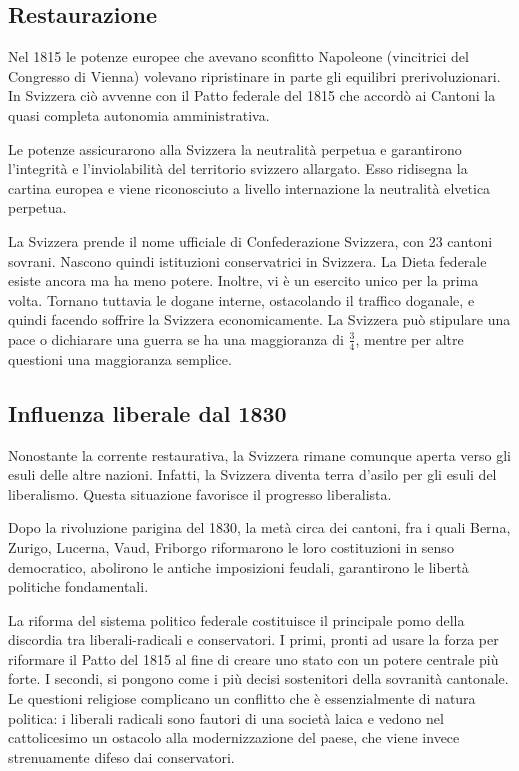 \documentclass[a4paper]{article}
\begin{document}
\subsection{Restaurazione}

Nel 1815 le potenze europee che avevano sconfitto Napoleone (vincitrici del Congresso di Vienna)
volevano ripristinare in parte gli equilibri prerivoluzionari.
In Svizzera ciò avvenne con il Patto federale del 1815 che
accordò ai Cantoni la quasi completa autonomia amministrativa.


Le potenze assicurarono alla Svizzera la neutralità perpetua e garantirono
l'integrità e l'inviolabilità del territorio svizzero allargato.
Esso ridisegna la cartina europea e viene riconosciuto a livello internazione la neutralità elvetica perpetua.

La Svizzera prende il nome ufficiale di Confederazione Svizzera, con 23 cantoni sovrani.
Nascono quindi istituzioni conservatrici in Svizzera.
La Dieta federale esiste ancora ma ha meno potere.
Inoltre, vi è un esercito unico per la prima volta.
Tornano tuttavia le dogane interne, ostacolando il traffico doganale, e quindi facendo
soffrire la Svizzera economicamente.
La Svizzera può stipulare una pace o dichiarare una guerra se ha una maggioranza di \(\frac{3}{4}\),
mentre per altre questioni una maggioranza semplice.

\subsection{Influenza liberale dal 1830}

Nonostante la corrente restaurativa, la Svizzera rimane
comunque aperta verso gli esuli delle altre nazioni.
Infatti, la Svizzera diventa terra d'asilo per gli esuli del liberalismo.
Questa situazione favorisce il progresso liberalista.

Dopo la rivoluzione parigina del 1830, la metà circa dei cantoni, fra i quali Berna, Zurigo,
Lucerna, Vaud, Friborgo riformarono le loro costituzioni in senso democratico,
abolirono le antiche imposizioni feudali, garantirono le libertà politiche fondamentali.

La riforma del sistema politico federale costituisce il principale pomo della discordia
tra liberali-radicali e conservatori. I primi, pronti ad usare la forza per riformare il Patto
del 1815 al fine di creare uno stato con un potere centrale più forte. I secondi, si
pongono come i più decisi sostenitori della sovranità cantonale. Le questioni religiose
complicano un conflitto che è essenzialmente di natura politica: i liberali radicali sono
fautori di una società laica e vedono nel cattolicesimo un ostacolo alla modernizzazione
del paese, che viene invece strenuamente difeso dai conservatori.
\end{document}

